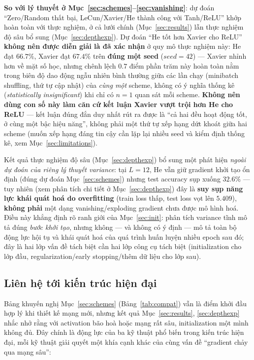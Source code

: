 \documentclass[12pt,a4paper]{article}
\newcommand{\en}[1]{\textit{#1}}
\begin{document}
\textbf{So với lý thuyết ở Mục~\ref{sec:schemes}--\ref{sec:vanishing}}: dự
đoán ``Zero/Random thất bại, LeCun/Xavier/He thành công với Tanh/ReLU'' khớp
hoàn toàn với thực nghiệm, ở cả lưới chính (Mục~\ref{sec:results}) lẫn
thực nghiệm độ sâu bổ sung (Mục~\ref{sec:depthexp}). Dự đoán ``He tốt hơn
Xavier cho ReLU'' \textbf{không nên được diễn giải là đã xác nhận} ở quy
mô thực nghiệm này: He đạt $66.7\%$, Xavier đạt $67.4\%$ trên
\textbf{đúng một seed} ($seed{=}42$) --- Xavier nhỉnh hơn về mặt số học,
nhưng chênh lệch $0.7$ điểm phần trăm này hoàn toàn nằm trong biên độ
dao động ngẫu nhiên bình thường giữa các lần chạy (minibatch shuffling,
thứ tự cập nhật) của \emph{cùng một} scheme, không có ý nghĩa thống kê
(\en{statistically insignificant}) khi chỉ có $n{=}1$ quan sát mỗi
scheme. \textbf{Không nên dùng con số này làm căn cứ kết luận Xavier vượt
trội hơn He cho ReLU} --- kết luận đúng đắn duy nhất rút ra được là ``cả
hai đều hoạt động tốt, ở cùng một bậc hiệu năng'', không phải một thứ tự
xếp hạng dứt khoát giữa hai scheme (muốn xếp hạng đáng tin cậy cần lặp
lại nhiều seed và kiểm định thống kê, xem Mục~\ref{sec:limitations}).

Kết quả thực nghiệm độ sâu (Mục~\ref{sec:depthexp}) bổ sung một phát hiện
\emph{ngoài dự đoán của riêng lý thuyết variance}: tại $L{=}12$, He vẫn
giữ gradient khởi tạo ổn định (đúng dự đoán Mục~\ref{sec:schemes}) nhưng
test accuracy sụp xuống $32.6\%$ --- tuy nhiên (xem phân tích chi tiết
ở Mục~\ref{sec:depthexp}) đây là \textbf{suy sụp năng lực khái quát hoá
do overfitting} (train loss thấp, test loss vọt lên $5.409$), \textbf{không
phải} một dạng vanishing/exploding gradient chưa được mô hình hoá. Điều
này khẳng định rõ ranh giới của Mục~\ref{sec:init}: phân tích variance
tĩnh mô tả đúng \emph{bước khởi tạo}, nhưng không --- và không có ý định
--- mô tả toàn bộ động lực hội tụ và khái quát hoá của quá trình huấn
luyện nhiều epoch sau đó; đây là hai lớp vấn đề tách biệt cần hai lớp
công cụ tách biệt (initialization cho lớp đầu, regularization/early
stopping/thêm dữ liệu cho lớp sau).

\subsection{Liên hệ tới kiến trúc hiện đại}

Bảng khuyến nghị Mục~\ref{sec:schemes} (Bảng~\ref{tab:compat}) vẫn là
điểm khởi đầu hợp lý khi thiết kế mạng mới, nhưng kết quả
Mục~\ref{sec:results}, \ref{sec:depthexp} nhắc nhở rằng với activation
bão hoà hoặc mạng rất sâu, initialization một mình không đủ. Đây chính là
động lực của ba kỹ thuật phổ biến trong kiến trúc hiện đại, mỗi kỹ thuật
giải quyết một khía cạnh khác của cùng vấn đề ``gradient chảy qua mạng
sâu'':
\end{document}
